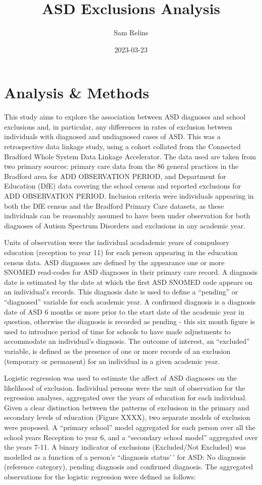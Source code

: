 \documentclass[
]{article}
\title{ASD Exclusions Analysis}
\author{Sam Relins}
\date{2023-03-23}
\begin{document}
\maketitle

\hypertarget{analysis-methods}{%
\section{Analysis \& Methods}\label{analysis-methods}}

This study aims to explore the association between ASD diagnoses and
school exclusions and, in particular, any differences in rates of
exclusion between individuals with diagnosed and undiagnosed cases of
ASD. This was a retrospective data linkage study, using a cohort
collated from the Connected Bradford Whole System Data Linkage
Accelerator. The data used are taken from two primary sources: primary
care data from the 86 general practices in the Bradford area for ADD
OBSERVATION PERIOD, and Department for Education (DfE) data covering the
school census and reported exclusions for ADD OBSERVATION PERIOD.
Inclusion criteria were individuals appearing in both the DfE census and
the Bradford Primary Care datasets, as these individuals can be
reasonably assumed to have been under observation for both diagnoses of
Autism Spectrum Disorders and exclusions in any academic year.

Units of observation were the individual acadademic years of compulsory
education (reception to year 11) for each person appearing in the
education census data. ASD diagnoses are defined by the appearance one
or more SNOMED read-codes for ASD diagnoses in their primary care
record. A diagnosis date is estimated by the date at which the first ASD
SNOMED code appears on an individual's records. This diagnosis date is
used to define a ``pending'' or ``diagnosed'' variable for each academic
year. A confirmed diagnosis is a diagnosis date of ASD 6 months or more
prior to the start date of the academic year in question, otherwise the
diagnosis is recorded as pending - this six month figure is used to
introduce period of time for schools to have made adjustments to
accommodate an individual's diagnosis. The outcome of interest, an
``excluded'' variable, is defined as the presence of one or more records
of an exclusion (temporary or permanent) for an individual in a given
academic year.

Logistic regression was used to estimate the affect of ASD diagnoses on
the likelihood of exclusion. Individual persons were the unit of
observation for the regression analyses, aggregated over the years of
education for each individual. Given a clear distinction between the
patterns of exclusison in the primary and secondary levels of education
(Figure XXXX), two separate models of exclusion were proposed. A
``primary school'' model aggregated for each person over all the school
years Reception to year 6, and a ``secondary school model'' aggregated
over the years 7-11. A binary indicator of exclusions (Excluded/Not
Excluded) was modelled as a function of a person's ``diagnosis
status'\,' for ASD: No diagnosis (reference category), pending diagnosis
and confirmed diagnosis. The aggregated observations for the logistic
regression were defined as follows:
\end{document}
